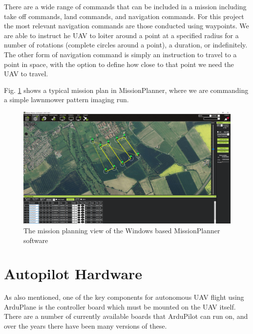 There are a wide range of commands that can be included in a mission including take off commands, land commands, and navigation commands. For this project the most relevant navigation commands are those conducted using waypoints. We are able to instruct he UAV to loiter around a point at a specified radius for a number of rotations (complete circles around a point), a duration, or indefinitely. The other form of navigation command is simply an instruction to travel to a point in space, with the option to define how close to that point we need the UAV to travel. 

Fig. \ref{fig:missionplanner} shows a typical mission plan in MissionPlanner, where we are commanding a simple lawnmower pattern imaging run. 

\begin{figure}[htbp!] 
\centering    
\includegraphics[width=\textwidth]{MissionPlanner}
\caption[MissionPlanner]{The mission planning view of the Windows based MissionPlanner software}
\label{fig:missionplanner}
\end{figure}

\section{Autopilot Hardware} 
\label{intro:hardware}

As also mentioned, one of the key components for autonomous UAV flight using ArduPlane is the controller board which must be mounted on the UAV itself. There are a number of currently available boards that ArduPilot can run on, and over the years there have been many versions of these. 



